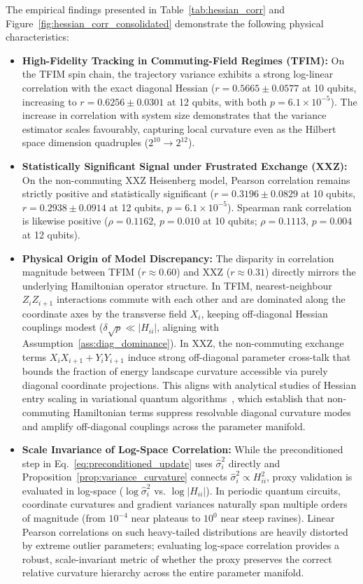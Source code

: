 \documentclass[11pt,a4paper]{article}
\begin{document}
The empirical findings presented in Table~\ref{tab:hessian_corr} and Figure~\ref{fig:hessian_corr_consolidated} demonstrate the following physical characteristics:
\begin{itemize}
    \item \textbf{High-Fidelity Tracking in Commuting-Field Regimes (TFIM):} On the TFIM spin chain, the trajectory variance exhibits a strong log-linear correlation with the exact diagonal Hessian ($r = 0.5665 \pm 0.0577$ at 10 qubits, increasing to $r = 0.6256 \pm 0.0301$ at 12 qubits, with both $p = 6.1 \times 10^{-5}$). The increase in correlation with system size demonstrates that the variance estimator scales favourably, capturing local curvature even as the Hilbert space dimension quadruples ($2^{10} \to 2^{12}$).
    \item \textbf{Statistically Significant Signal under Frustrated Exchange (XXZ):} On the non-commuting XXZ Heisenberg model, Pearson correlation remains strictly positive and statistically significant ($r = 0.3196 \pm 0.0829$ at 10 qubits, $r = 0.2938 \pm 0.0914$ at 12 qubits, $p = 6.1 \times 10^{-5}$). Spearman rank correlation is likewise positive ($\rho = 0.1162$, $p = 0.010$ at 10 qubits; $\rho = 0.1113$, $p = 0.004$ at 12 qubits).
    \item \textbf{Physical Origin of Model Discrepancy:} The disparity in correlation magnitude between TFIM ($r \approx 0.60$) and XXZ ($r \approx 0.31$) directly mirrors the underlying Hamiltonian operator structure. In TFIM, nearest-neighbour $Z_i Z_{i+1}$ interactions commute with each other and are dominated along the coordinate axes by the transverse field $X_i$, keeping off-diagonal Hessian couplings modest ($\delta \sqrt{p} \ll |H_{ii}|$, aligning with Assumption~\ref{ass:diag_dominance}). In XXZ, the non-commuting exchange terms $X_i X_{i+1} + Y_i Y_{i+1}$ induce strong off-diagonal parameter cross-talk that bounds the fraction of energy landscape curvature accessible via purely diagonal coordinate projections. This aligns with analytical studies of Hessian entry scaling in variational quantum algorithms~\cite{hessian_resolvability_2026}, which establish that non-commuting Hamiltonian terms suppress resolvable diagonal curvature modes and amplify off-diagonal couplings across the parameter manifold.
    \item \textbf{Scale Invariance of Log-Space Correlation:} While the preconditioned step in Eq.~\eqref{eq:preconditioned_update} uses $\hat{\sigma}_i^2$ directly and Proposition~\ref{prop:variance_curvature} connects $\hat{\sigma}_i^2 \propto H_{ii}^2$, proxy validation is evaluated in log-space ($\log \hat{\sigma}_i^2$ vs. $\log |H_{ii}|$). In periodic quantum circuits, coordinate curvatures and gradient variances naturally span multiple orders of magnitude (from $10^{-4}$ near plateaus to $10^0$ near steep ravines). Linear Pearson correlations on such heavy-tailed distributions are heavily distorted by extreme outlier parameters; evaluating log-space correlation provides a robust, scale-invariant metric of whether the proxy preserves the correct relative curvature hierarchy across the entire parameter manifold.
\end{itemize}
\end{document}
